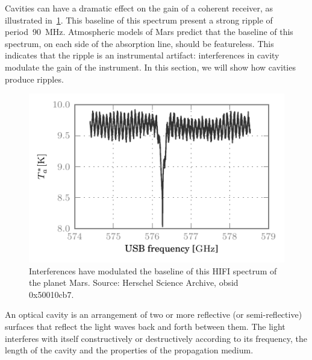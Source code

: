 Cavities can have a dramatic effect on the gain of a coherent receiver, as illustrated in~\cref{fig:mars_50010cb7_WBSH_USB_chp2}.
This baseline of this spectrum present a strong ripple of period~\SI{90}{\mega\hertz}.
Atmospheric models of Mars predict that the baseline of this spectrum, on each side of the absorption line, should be featureless.
This indicates that the ripple is an instrumental artifact: interferences in cavity modulate the gain of the instrument.
In this section, we will show how cavities produce ripples.
\begin{figure}[hbtp]
    \centering
    \includegraphics[width=\textwidth]{mars_50010cb7_WBSH_USB}
    \caption{Interferences have modulated the baseline of this HIFI spectrum of the planet Mars.
        Source: Herschel Science Archive, obsid 0x50010cb7.
    }
    \label{fig:mars_50010cb7_WBSH_USB_chp2}
\end{figure}

An optical cavity is an arrangement of two or more reflective (or semi-reflective) surfaces that reflect the light waves back and forth between them.
The light interferes with itself constructively or destructively according to its frequency, the length of the cavity and the properties of the propagation medium.

